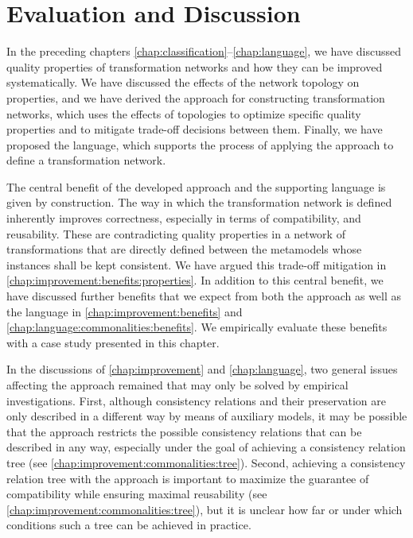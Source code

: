 \chapter{Evaluation and Discussion 
}
\label{chap:commonalities_evaluation}

In the preceding chapters \ref{chap:classification}--\ref{chap:language}, we have discussed quality properties of transformation networks and how they can be improved systematically.
We have discussed the effects of the network topology on properties, and we have derived the \commonalities approach for constructing transformation networks, which uses the effects of topologies to optimize specific quality properties and to mitigate trade-off decisions between them.
Finally, we have proposed the \commonalities language, which supports the process of applying the \commonalities approach to define a transformation network.

The central benefit of the developed \commonalities approach and the supporting \commonalities language is given by construction.
The way in which the transformation network is defined inherently improves correctness, especially in terms of compatibility, and reusability. 
These are contradicting quality properties in a network of transformations that are directly defined between the metamodels whose instances shall be kept consistent.
We have argued this trade-off mitigation in \autoref{chap:improvement:benefits:properties}.
In addition to this central benefit, we have discussed further benefits that we expect from both the \commonalities approach as well as the \commonalities language in \autoref{chap:improvement:benefits} and \autoref{chap:language:commonalities:benefits}.
We empirically evaluate these benefits with a case study presented in this chapter.

In the discussions of \autoref{chap:improvement} and \autoref{chap:language}, two general issues affecting the \commonalities approach remained that may only be solved by empirical investigations.
First, although consistency relations and their preservation are only described in a different way by means of auxiliary models, it may be possible that the approach restricts the possible consistency relations that can be described in any way, especially under the goal of achieving a consistency relation tree (see \autoref{chap:improvement:commonalities:tree}).
Second, achieving a consistency relation tree with the approach is important to maximize the guarantee of compatibility while ensuring maximal reusability (see \autoref{chap:improvement:commonalities:tree}), but it is unclear how far or under which conditions such a tree can be achieved in practice.

